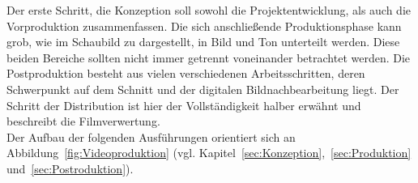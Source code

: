 \documentclass[times, 11pt,twocolumn]{article}
\begin{document}
Der erste Schritt, die Konzeption soll sowohl die Projektentwicklung, als auch die Vorproduktion zusammenfassen. Die sich anschließende Produktionsphase kann grob, wie im Schaubild zu dargestellt, in Bild und Ton unterteilt werden. Diese beiden Bereiche sollten nicht immer getrennt voneinander betrachtet werden. Die Postproduktion besteht aus vielen verschiedenen Arbeitsschritten, deren Schwerpunkt auf dem Schnitt und der digitalen Bildnachbearbeitung liegt. Der Schritt der Distribution ist hier der Vollständigkeit halber erwähnt und beschreibt die Filmverwertung. \\
Der Aufbau der folgenden Ausführungen orientiert sich an Abbildung~\ref{fig:Videoproduktion} (vgl. Kapitel~\ref{sec:Konzeption},~\ref{sec:Produktion} und~\ref{sec:Postroduktion}).
\end{document}
